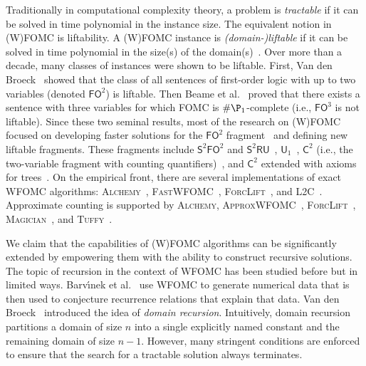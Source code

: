 \documentclass{article}
\newcommand{\FOtwo}{$\mathsf{FO}^{2}$}
\newcommand{\FOthree}{$\mathsf{FO}^{3}$}
\newcommand{\SFO}{$\mathsf{S}^{2}\mathsf{FO}^{2}$}
\newcommand{\SRU}{$\mathsf{S}^{2}\mathsf{RU}$}
\newcommand{\Uone}{$\mathsf{U}_{1}$}
\newcommand{\Ctwo}{$\mathsf{C}^{2}$}
\begin{document}
Traditionally in computational complexity theory, a problem is \emph{tractable}
if it can be solved in time polynomial in the instance size. The equivalent
notion in (W)FOMC is liftability. A (W)FOMC instance is \emph{(domain-)liftable}
if it can be solved in time polynomial in the size(s) of the
domain(s)~\cite{DBLP:conf/starai/JaegerB12}. Over more than a decade, many
classes of instances were shown to be liftable. First, Van den
Broeck~ showed that the class of all
sentences of first-order logic with up to two variables (denoted \FOtwo{}) is
liftable. Then Beame et al.~ proved that
there exists a sentence with three variables for which FOMC is
$\#\P_{1}$-complete (i.e., \FOthree{} is not liftable). Since these two seminal
results, most of the research on (W)FOMC focused on developing faster solutions
for the \FOtwo{}
fragment~\cite{DBLP:conf/uai/BremenK21,DBLP:conf/aaai/MalhotraS22} and defining
new liftable fragments. These fragments include \SFO{} and
\SRU{}~\cite{DBLP:conf/nips/KazemiKBP16},
\Uone{}~\cite{DBLP:conf/lics/KuusistoL18}, \Ctwo{} (i.e., the two-variable
fragment with counting
quantifiers)~\cite{DBLP:journals/jair/Kuzelka21,DBLP:conf/aaai/MalhotraS22}, and
\Ctwo{} extended with axioms for trees~\cite{DBLP:conf/kr/BremenK21}. On the
empirical front, there are several implementations of exact WFOMC algorithms:
\textsc{Alchemy}~\cite{DBLP:journals/cacm/GogateD16},
\textsc{FastWFOMC}~\cite{DBLP:conf/uai/BremenK21},
\textsc{ForcLift}~\cite{DBLP:conf/ijcai/BroeckTMDR11}, and
\textsc{L2C}~\cite{DBLP:conf/kr/KazemiP16}. Approximate counting is supported by
\textsc{Alchemy}, \textsc{ApproxWFOMC}~\cite{DBLP:conf/ijcai/BremenK20},
\textsc{ForcLift}~\cite{DBLP:conf/uai/BroeckCD12},
\textsc{Magician}~\cite{DBLP:conf/aaai/VenugopalSG15}, and
\textsc{Tuffy}~\cite{DBLP:journals/pvldb/NiuRDS11}.


We claim that the capabilities of (W)FOMC algorithms can be significantly
extended by empowering them with the ability to construct recursive solutions.
The topic of recursion in the context of WFOMC has been studied before but in
limited ways. Barv{\'{\i}}nek et al.~
use WFOMC to generate numerical data that is then used to conjecture recurrence
relations that explain that data. Van den
Broeck~ introduced the idea of \emph{domain
  recursion}. Intuitively, domain recursion partitions a domain of size $n$ into
a single explicitly named constant and the remaining domain of size $n-1$.
However, many stringent conditions are enforced to ensure that the search for a
tractable solution always terminates.
\end{document}
